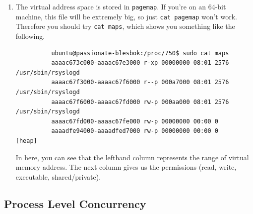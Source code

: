 \documentclass{article}
\begin{document}
\begin{example}
\begin{enumerate}
        \item The virtual address space is stored in \texttt{pagemap}. If you're on an 64-bit machine, this file will be extremely big, so just \texttt{cat pagemap} won't work. Therefore you should try \texttt{cat maps}, which shows you something like the following. 

        \begin{lstlisting}
          ubuntu@passionate-blesbok:/proc/750$ sudo cat maps
          aaaac673c000-aaaac67e3000 r-xp 00000000 08:01 2576                       /usr/sbin/rsyslogd
          aaaac67f3000-aaaac67f6000 r--p 000a7000 08:01 2576                       /usr/sbin/rsyslogd
          aaaac67f6000-aaaac67fd000 rw-p 000aa000 08:01 2576                       /usr/sbin/rsyslogd
          aaaac67fd000-aaaac67fe000 rw-p 00000000 00:00 0 
          aaaadfe94000-aaaadfed7000 rw-p 00000000 00:00 0                          [heap] 
        \end{lstlisting}
        In here, you can see that the lefthand column represents the range of virtual memory address. The next column gives us the permissions (read, write, executable, shared/private). 
      \end{enumerate}
    \end{example}

  \subsection{Process Level Concurrency}
\end{document}
